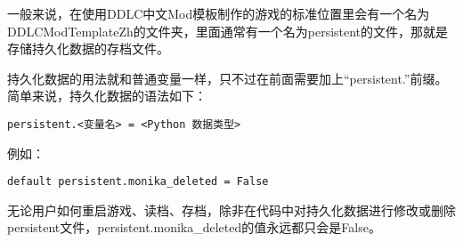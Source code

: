 一般来说，在使用DDLC中文Mod模板制作的游戏的标准位置里会有一个名为 DDLCModTemplateZh的文件夹，里面通常有一个名为persistent的文件，那就是存储持久化数据的存档文件。

持久化数据的用法就和普通变量一样，只不过在前面需要加上“persistent.”前缀。简单来说，持久化数据的语法如下：

\begin{lstlisting}
persistent.<变量名> = <Python 数据类型>
\end{lstlisting}

例如：
\begin{lstlisting}
default persistent.monika_deleted = False
\end{lstlisting}

无论用户如何重启游戏、读档、存档，除非在代码中对持久化数据进行修改或删除persistent文件，persistent.monika\_deleted的值永远都只会是False。
